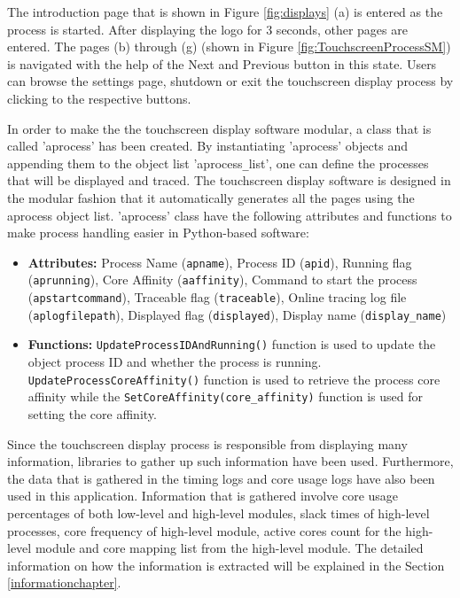 The introduction page that is shown in Figure \ref{fig:displays} (a) is entered as the process is started. After displaying the logo for 3 seconds, other pages are entered. The pages (b) through (g) (shown in Figure \ref{fig:TouchscreenProcessSM}) is navigated with the help of the Next and Previous button in this state. Users can browse the settings page, shutdown or exit the touchscreen display process by clicking to the respective buttons.

In order to make the the touchscreen display software modular, a class that is called 'aprocess' has been created. By instantiating 'aprocess' objects and appending them to the object list 'aprocess\texttt{\_}list', one can define the processes that will be displayed and traced. The touchscreen display software is designed in the modular fashion that it automatically generates all the pages using the aprocess object list. 'aprocess' class have the following attributes and functions to make process handling easier in Python-based software:

\begin{itemize}
	\item \textbf{Attributes:} Process Name (\texttt{apname}), Process ID (\texttt{apid}), Running flag (\texttt{aprunning}), Core Affinity (\texttt{aaffinity}), Command to start the process (\texttt{apstartcommand}), Traceable flag (\texttt{traceable}), Online tracing log file (\texttt{aplogfilepath}), Displayed flag (\texttt{displayed}), Display name (\texttt{display\_name})
	\item \textbf{Functions:} \texttt{UpdateProcessIDAndRunning()} function is used to update the object process ID and whether the process is running. \texttt{UpdateProcessCoreAffinity()} function is used to retrieve the process core affinity while the  \texttt{SetCoreAffinity(core\_affinity)} function is used for setting the core affinity.
\end{itemize}

Since the touchscreen display process is responsible from displaying many information, libraries to gather up such information have been used. Furthermore, the data that is gathered in the timing logs and core usage logs have also been used in this application. Information that is gathered involve core usage percentages of both low-level and high-level modules, slack times of high-level processes, core frequency of high-level module, active cores count for the high-level module and core mapping list from the high-level module. The detailed information on how the information is extracted will be explained in the Section \ref{informationchapter}.

